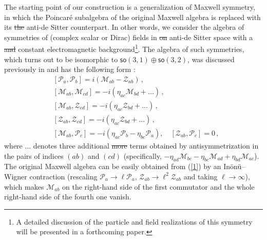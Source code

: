 \documentclass[11pt, a4paper]{article}
\newcommand{\lang}[1]{\textcolor{langfix}{#1}}
\newcommand{\subst}[1]{\textcolor{substantive}{#1}}
\newcommand{\rem}[1]{\textcolor{removeprop}{\sout{#1}}}
\def\so{\mathsf{so}}
\begin{document}
The starting point of our construction is a generalization of Maxwell symmetry, in which the Poincar\'e subalgebra of the original Maxwell algebra \cite{Bacry:1970ye, Schrader:1972zd} is replaced with \lang{its} \rem{the} anti-de Sitter counterpart. In other words, we consider the algebra of symmetries of (complex scalar \lang{or} Dirac) fields \lang{in} \rem{on} anti-de Sitter space \lang{with a} \rem{and} constant electromagnetic background\footnote{A detailed discussion \subst{of the particle and field realizations of this symmetry} will be presented in a forthcoming paper.}. The algebra of such symmetries, which turns out to be isomorphic to $\so(3,1)\oplus\so(3,2)$, was discussed previously in \cite{Soroka:2006aj, Bonanos:2010fw, Lukierski:2010dy} and has the following form \cite{Durka:2011nf}:
\begin{align}
&[\mathcal{P}_{a},\mathcal{P}_{b}]=i(\mathcal{M}_{ab}-\mathcal{Z}_{ab})\, ,\nonumber\\
&[\mathcal{M}_{ab},\mathcal{M}_{cd}]=-i(\eta_{ac}\mathcal{M}_{bd}+\ldots)\, ,\nonumber\\
&[\mathcal{M}_{ab},\mathcal{Z}_{cd}]=-i(\eta_{ac}\mathcal{Z}_{bd}+\ldots)\,,\nonumber\\
&[\mathcal{Z}_{ab},\mathcal{Z}_{cd}]=-i(\eta_{ac}\mathcal{Z}_{bd}+\ldots)\, ,\nonumber\\
&[\mathcal{M}_{ab},\mathcal{P}_c]=-i(\eta_{ac}\mathcal{P}_{b}-\eta_{bc}\mathcal{P}_{a}),\quad
[\mathcal{Z}_{ab},\mathcal{P}_{c}]=0\,,\label{1}
\end{align}
where $\ldots$ denotes three \lang{additional} \rem{more} terms obtained by antisymmetrization in the pairs of indices $(ab)$ and $(cd)$ \subst{(specifically, $-\eta_{ad}\mathcal{M}_{bc} - \eta_{bc}\mathcal{M}_{ad} + \eta_{bd}\mathcal{M}_{ac}$)}. The original Maxwell algebra \cite{Soroka:2006aj, Bonanos:2010fw, Lukierski:2010dy} can be easily obtained from (\ref{1}) by \lang{an In\"on\"u--Wigner} contraction \subst{(rescaling $\mathcal{P}_a \to \ell \mathcal{P}_a$, $\mathcal{Z}_{ab} \to \ell^2 \mathcal{Z}_{ab}$ and taking $\ell \to \infty$)}, which makes $\mathcal{M}_{ab}$ on the right-hand side of the first commutator and the whole right-hand side of the fourth one vanish.
\end{document}
